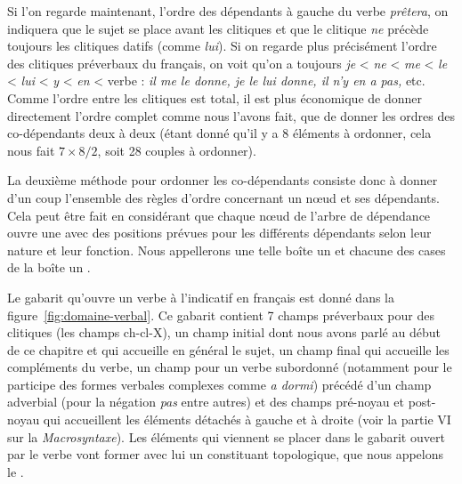 Si l’on regarde maintenant, l’ordre des dépendants à gauche du verbe \textit{prêtera}, on indiquera que le sujet se place avant les clitiques et que le clitique \textit{ne} précède toujours les clitiques datifs (comme \textit{lui}). Si on regarde plus précisément l’ordre des clitiques préverbaux du français, on voit qu’on a toujours \textit{je} < \textit{ne} < \textit{me} < \textit{le} < \textit{lui} < \textit{y} < \textit{en} < verbe : \textit{il me le donne, je le lui donne, il n’y en a pas,} etc. Comme l’ordre entre les clitiques est total, il est plus économique de donner directement l’ordre complet comme nous l’avons fait, que de donner les ordres des co-dépendants deux à deux (étant donné qu’il y a 8 éléments à ordonner, cela nous fait $7\times{8}/{2}$, soit 28 couples à ordonner).\largerpage

La deuxième méthode pour ordonner les co-dépendants consiste donc à donner d’un coup l’ensemble des règles d’ordre concernant un nœud et ses dépendants. Cela peut être fait en considérant que chaque nœud de l’arbre de dépendance ouvre une  avec des positions prévues pour les différents dépendants selon leur nature et leur fonction. Nous appellerons une telle boîte un  et chacune des cases de la boîte un .

\begin{sloppypar}
Le gabarit qu’ouvre un verbe à l’indicatif en français est donné dans la figure~\ref{fig:domaine-verbal}. Ce gabarit contient 7 champs préverbaux pour des clitiques (les champs ch-cl-X), un champ initial dont nous avons parlé au début de ce chapitre et qui accueille en général le sujet, un champ final qui accueille les compléments du verbe, un champ pour un verbe subordonné (notamment pour le participe des formes verbales complexes comme \textit{a dormi}) précédé d’un champ adverbial (pour la négation \textit{pas} entre autres) et des champs pré-noyau et post-noyau qui accueillent les éléments détachés à gauche et à droite (voir la partie VI sur la \textit{Macrosyntaxe}). Les éléments qui viennent se placer dans le gabarit ouvert par le verbe vont former avec lui un constituant topologique, que nous appelons le .
\end{sloppypar}

